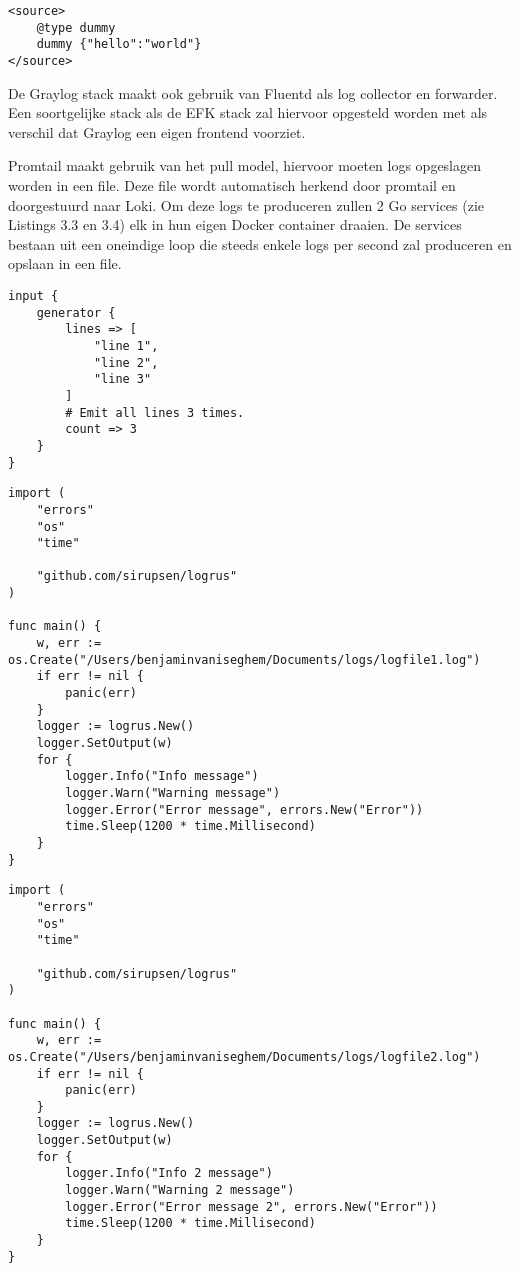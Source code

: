 \begin{lstlisting}[caption=Fluentd dummy log generator]
<source>
    @type dummy
    dummy {"hello":"world"}
</source>
\end{lstlisting}

De Graylog stack maakt ook gebruik van Fluentd als log collector en forwarder. Een soortgelijke stack als de EFK stack zal hiervoor opgesteld worden met als verschil dat Graylog een eigen frontend voorziet. 

Promtail maakt gebruik van het pull model, hiervoor moeten logs opgeslagen worden in een file. Deze file wordt automatisch herkend door promtail en doorgestuurd naar Loki. Om deze logs te produceren zullen 2 Go services (zie Listings 3.3 en 3.4) elk in hun eigen Docker container draaien. De services bestaan uit een oneindige loop die steeds enkele logs per second zal produceren en opslaan in een file. 

\begin{lstlisting}[caption=Logstash dummy log generator]
input {
    generator {
        lines => [
            "line 1",
            "line 2",
            "line 3"
        ]
        # Emit all lines 3 times.
        count => 3
    }
}
\end{lstlisting}

\begin{lstlisting}[caption=Log generator main function]
import (
    "errors"
    "os"
    "time"
    
    "github.com/sirupsen/logrus"
)

func main() {
    w, err := os.Create("/Users/benjaminvaniseghem/Documents/logs/logfile1.log")
    if err != nil {
        panic(err)
    }
    logger := logrus.New()
    logger.SetOutput(w)
    for {
        logger.Info("Info message")
        logger.Warn("Warning message")
        logger.Error("Error message", errors.New("Error"))
        time.Sleep(1200 * time.Millisecond)
    }
}
\end{lstlisting}

\begin{lstlisting}[caption=Log generator 2 main function ]
import (
    "errors"
    "os"
    "time"
    
    "github.com/sirupsen/logrus"
)

func main() {
    w, err := os.Create("/Users/benjaminvaniseghem/Documents/logs/logfile2.log")
    if err != nil {
        panic(err)
    }
    logger := logrus.New()
    logger.SetOutput(w)
    for {
        logger.Info("Info 2 message")
        logger.Warn("Warning 2 message")
        logger.Error("Error message 2", errors.New("Error"))
        time.Sleep(1200 * time.Millisecond)
    }
}
\end{lstlisting}

